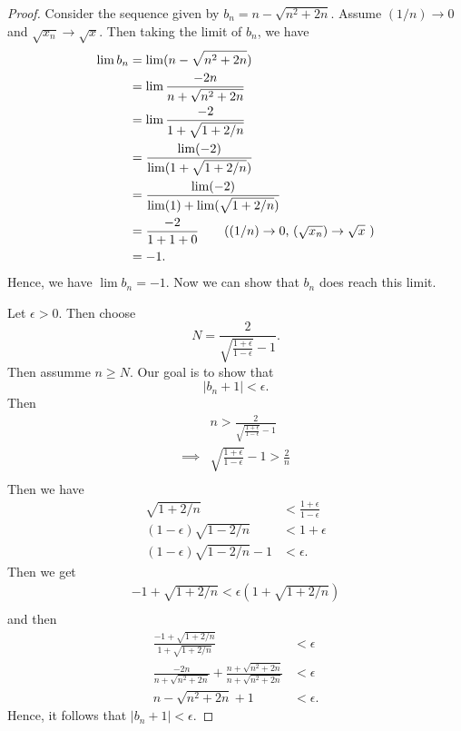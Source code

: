 \begin{proof}
Consider the sequence given by \( b_n = n - \sqrt{n^2 + 2n}\). Assume \( (1 / n ) \to 0\) and \( \sqrt{x_n} \to \sqrt{x} \). Then taking the limit of \( b_n\), we have 
\begin{align*}
    \lim b_n &= \lim (n - \sqrt{n^2 + 2n}) \\
             &= \lim   \frac{-2n}{n + \sqrt{n^2 + 2n}} \\  
             &= \lim \frac{ -2}{ 1 + \sqrt{1 + 2 / n}} \\
             &= \frac{ \lim (-2) }{ \lim (1 + \sqrt{1 + 2 / n})} \\
             &= \frac{\lim(-2)}{\lim (1) + \lim (\sqrt{1 + 2 / n})} \\
             &= \frac{-2}{1 + 1 + 0} \tag{\((1/n) \to 0\), \( (\sqrt{x_n}) \to \sqrt{x} \) } \\
             &= -1.
\end{align*}
Hence, we have \( \lim b_n = -1 \). Now we can show that \( b_n\) does reach this limit. 

Let \( \epsilon > 0\). Then choose 
\[ N = \frac{2}{ \sqrt{ \frac{1 + \epsilon }{1 - \epsilon }} - 1}.\]
Then assumme \( n \geq N \). Our goal is to show that 
\[ | b_n + 1 | < \epsilon.\]
Then 
\begin{align*}
    &n >  \frac{2}{ \sqrt{ \frac{1 + \epsilon }{1 - \epsilon }} - 1} \\
    \implies &\sqrt{ \frac{1 + \epsilon }{1 - \epsilon }} -1  > \frac{2}{n}  \\  
\end{align*} Then we have 
\begin{align*}
  \sqrt{1+2/n}  &< \frac{1 + \epsilon }{1 - \epsilon } \\
  (1 - \epsilon )\sqrt{1 - 2/n} &< 1 + \epsilon \\   
  (1 - \epsilon )\sqrt{1 - 2/n} - 1 &< \epsilon .
\end{align*}
Then we get 
\begin{align*}
    - 1 + \sqrt{1 + 2 / n} < \epsilon ( 1 + \sqrt{ 1 + 2 / n})     \\
\end{align*}
and then 
\begin{align*}
    \frac{ - 1 + \sqrt{1 + 2/n}}{ 1 + \sqrt{ 1 + 2/n}} &< \epsilon \\ 
    \frac{ -2n}{ n + \sqrt{ n^2 + 2n}} + \frac{n + \sqrt{n^2 + 2n}}{ n + \sqrt{ n^2 + 2n}} &< \epsilon \\ 
    n - \sqrt{n^2 + 2n} + 1 &< \epsilon.
\end{align*}
Hence, it follows that \( | b_n + 1  | < \epsilon\).

\end{proof}

